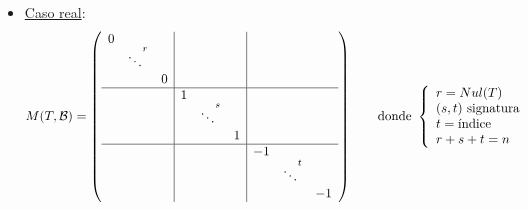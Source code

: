 \begin{teo}
\begin{itemize}
        \item \underline{Caso real}:
        \begin{equation*}
            M(T,\mathcal{B}) = \left( \begin{array}{ccc|ccc|ccc}
                0&&&&&&& \\
                &\ddots ^r&&&&&&& \\
                &&0&&&&&& \\ \hline
                &&&1&&&&& \\
                &&&&\ddots^s&&&& \\
                &&&&&1&&& \\ \hline
                &&&&&&-1&& \\
                &&&&&&&\ddots ^t& \\
                &&&&&&&&-1 \\
            \end{array}\right)  \qquad \text{donde } \left\{\begin{array}{l}
                 r=Nul(T) \\
                 (s, t) \text{ signatura}  \\
                 t=\text{índice} \\
                 r+s+t=n
            \end{array}\right.
        \end{equation*}
    \end{itemize}
\end{teo}

